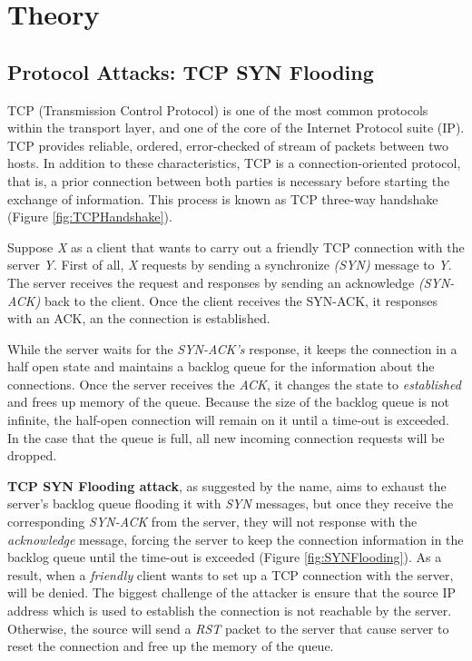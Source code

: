 

\chapter{Theory}
\label{chapter:theory}

\section{Protocol Attacks: TCP SYN Flooding}

TCP (Transmission Control Protocol) is one of the most common protocols within the transport layer, and one of the core of the Internet Protocol suite (IP). TCP provides reliable, ordered, error-checked of stream of packets between two hosts. In addition to these characteristics, TCP is a connection-oriented protocol, that is, a prior connection between both parties is necessary before starting the exchange of information. This process is known as TCP three-way handshake (Figure \ref{fig:TCPHandshake}).

\par

Suppose \textit{X} as a client that wants to carry out a friendly TCP connection with the server \textit{Y}. First of all, \textit{X} requests by sending a synchronize \textit{(SYN)} message to \textit{Y}. The server receives the request and responses by sending an acknowledge \textit{(SYN-ACK)} back to the client. Once the client receives the SYN-ACK, it responses with an ACK, an the connection is established. 

\par

While the server waits for the \textit{SYN-ACK's} response, it keeps the connection in a half open state and maintains a backlog queue for the information about the connections. Once the server receives the \textit{ACK}, it changes the state to \textit{established} and frees up memory of the queue. Because the size of the backlog queue is not infinite, the half-open connection will remain on it until a time-out is exceeded. In the case that the queue is full, all new incoming connection requests will be dropped.

\bigskip

\textbf{TCP SYN Flooding attack}, as suggested by the name, aims to exhaust the server's backlog queue flooding it with \textit{SYN} messages, but once they receive the corresponding \textit{SYN-ACK} from the server, they will not response with the \textit{acknowledge} message, forcing the server to keep the connection information in the backlog queue until the time-out is exceeded (Figure \ref{fig:SYNFlooding}). As a result, when a \textit{friendly} client wants to set up a TCP connection with the server, will be denied. The biggest challenge of the attacker is ensure that the source IP address which is used to establish the connection is not reachable by the server. Otherwise, the source will send a \textit{RST} packet to the server that cause server to reset the connection and free up the memory of the queue.



